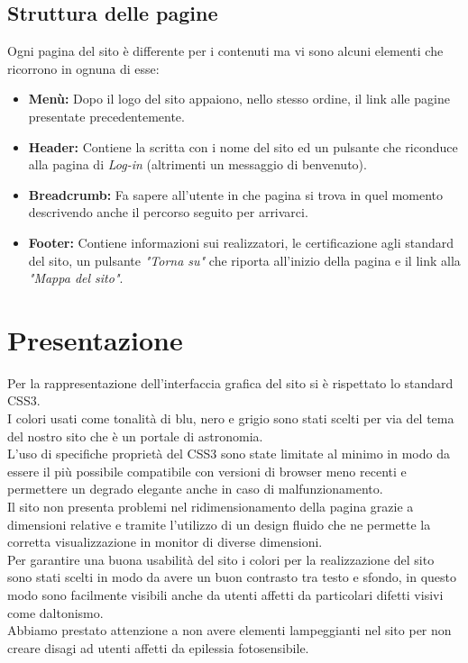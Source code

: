 	\subsection{Struttura delle pagine}
	Ogni pagina del sito è differente per i contenuti ma vi sono alcuni elementi che ricorrono in ognuna di esse:
	\begin{itemize}
	\item \textbf{Menù:}  Dopo il logo del sito appaiono, nello stesso ordine, il link alle pagine presentate precedentemente.
	\item \textbf{Header:} Contiene la scritta con i nome del sito ed un pulsante che riconduce alla pagina di \textit{Log-in} (altrimenti un messaggio di benvenuto).
	\item \textbf{Breadcrumb:} Fa sapere all'utente in che pagina si trova in quel momento descrivendo anche il percorso seguito per arrivarci. 
	\item \textbf{Footer:} Contiene informazioni sui realizzatori, le certificazione agli standard del sito, un pulsante \textit{"Torna su"} che riporta all'inizio della pagina e il link alla \textit{"Mappa del sito"}.
	\end{itemize}
	 
\section{Presentazione}
	Per la rappresentazione dell'interfaccia grafica del sito si è rispettato lo standard CSS3. \\
	I colori usati come tonalità di blu, nero e grigio sono stati scelti per via del tema del nostro sito che è un portale di astronomia. \\
	L'uso di specifiche proprietà del CSS3 sono state limitate al minimo in modo da essere il più possibile compatibile con versioni di browser meno recenti e permettere un degrado elegante anche in caso di malfunzionamento. \\
	Il sito non presenta problemi nel ridimensionamento della pagina grazie a dimensioni relative e tramite l'utilizzo di un design fluido che ne permette la corretta visualizzazione in monitor di diverse dimensioni. \\
	Per garantire una buona usabilità del sito i colori per la realizzazione del sito sono stati scelti in modo da avere un buon contrasto tra testo e sfondo, in questo modo sono facilmente visibili anche da utenti affetti da particolari difetti visivi come daltonismo. \\
	Abbiamo prestato attenzione a non avere elementi lampeggianti nel sito per non creare disagi ad utenti affetti da epilessia fotosensibile. \\
